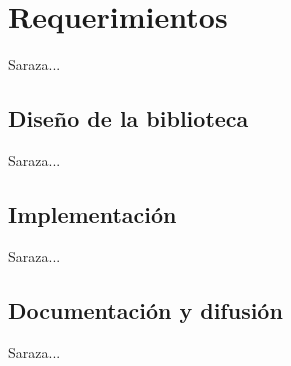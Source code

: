 \section{Requerimientos}
\label{sec:requerimientos}

Saraza...

\subsection{Diseño de la biblioteca}

Saraza...

\subsection{Implementación}

Saraza...

\subsection{Documentación y difusión}

Saraza...
